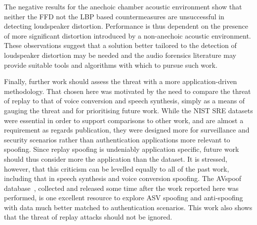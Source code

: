 The negative results for the anechoic chamber acoustic environment show that neither the FFD not the LBP based countermeasures are unsuccessful in detecting loudspeaker distortion.  Performance is thus dependent on the presence of more significant distortion introduced by a non-anechoic acoustic environment.  These observations suggest that a solution better tailored to the detection of loudspeaker distortion may be needed and the audio forensics literature may provide suitable tools and algorithms with which to pursue such work.

Finally, further work should assess the threat with a more application-driven methodology.  That chosen here was motivated by the need to compare the threat of replay to that of voice conversion and speech synthesis, simply as a means of gauging the threat and for prioritising future work.  While the NIST SRE datasets were essential in order to support comparisons to other work, and are almost a requirement as regards publication, they were designed more for surveillance and security scenarios rather than authentication applications more relevant to spoofing.  Since replay spoofing is undeniably application specific, future work should thus consider more the application than the dataset.  It is stressed, however, that this criticism can be levelled equally to all of the past work, including that in speech synthesis and voice conversion spoofing.  The AVspoof database~\cite{Ergunay2015}, collected and released some time after the work reported here was performed, is one excellent resource to explore ASV spoofing and anti-spoofing with data much better matched to authentication scenarios.  This work also shows that the threat of replay attacks should not be ignored.
